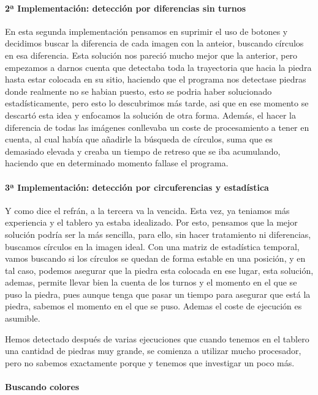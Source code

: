 \documentclass[12pt,a4paper]{report}
\begin{document}
\paragraph{2ª Implementación: detección por diferencias sin turnos}

En esta segunda implementación pensamos en suprimir el uso de botones y
decidimos buscar la diferencia de cada imagen con la anteior, buscando círculos
en esa diferencia. Esta solución nos pareció mucho mejor que la anterior, pero
empezamos a darnos cuenta que detectaba toda la trayectoria que hacia la piedra
hasta estar colocada en su sitio, haciendo que el programa nos detectase piedras
donde realmente no se habian puesto, esto se podria haber solucionado
estadísticamente, pero esto lo descubrimos más tarde, asi que en ese momento se
descartó esta idea y enfocamos la solución de otra forma. Además, el hacer la
diferencia de todas las imágenes conllevaba un coste de procesamiento a tener en
cuenta, al cual había que añadirle la búsqueda de círculos, suma que es
demasiado elevada y creaba un tiempo de retreso que se iba acumulando, haciendo
que en determinado momento fallase el programa.

\paragraph{3ª Implementación: detección por circuferencias y estadística}

Y como dice el refrán, a la tercera va la vencida. Esta vez, ya teniamos más
experiencia y el tablero ya estaba idealizado. Por esto, pensamos que la mejor
solución podría ser la más sencilla, para ello, sin hacer tratamiento ni
diferencias, buscamos círculos en la imagen ideal. Con una matriz de estadística
temporal, vamos buscando si los círculos se quedan de forma estable en una
posición, y en tal caso, podemos asegurar que la piedra esta colocada en ese
lugar, esta solución, ademas, permite llevar bien la cuenta de los turnos y el
momento en el que se puso la piedra, pues aunque tenga que pasar un tiempo para
asegurar que está la piedra, sabemos el momento en el que se puso. Ademas el
coste de ejecución es asumible.

Hemos detectado después de varias ejecuciones que cuando tenemos en el tablero
una cantidad de piedras muy grande, se comienza a utilizar mucho procesador,
pero no sabemos exactamente porque y tenemos que investigar un poco más. 

\paragraph{Buscando colores}
\end{document}
